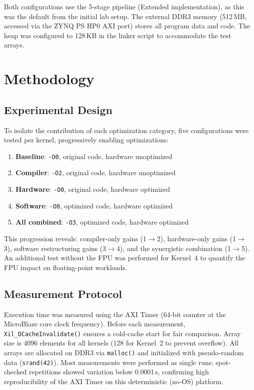 \documentclass[11pt,a4paper]{article}
\begin{document}
Both configurations use the 5-stage pipeline (Extended implementation), as this was the default from the initial lab setup. The external DDR3 memory (512\,MB, accessed via the ZYNQ PS HP0 AXI port) stores all program data and code. The heap was configured to 128\,KB in the linker script to accommodate the test arrays.

\section{Methodology}

\subsection{Experimental Design}

To isolate the contribution of each optimization category, five configurations were tested per kernel, progressively enabling optimizations:

\begin{enumerate}[noitemsep]
    \item \textbf{Baseline}: \texttt{-O0}, original code, hardware unoptimized
    \item \textbf{Compiler}: \texttt{-O2}, original code, hardware unoptimized
    \item \textbf{Hardware}: \texttt{-O0}, original code, hardware optimized
    \item \textbf{Software}: \texttt{-O0}, optimized code, hardware optimized
    \item \textbf{All combined}: \texttt{-O3}, optimized code, hardware optimized
\end{enumerate}

This progression reveals: compiler-only gains (1$\to$2), hardware-only gains (1$\to$3), software restructuring gains (3$\to$4), and the synergistic combination (1$\to$5). An additional test without the FPU was performed for Kernel~4 to quantify the FPU impact on floating-point workloads.

\subsection{Measurement Protocol}

Execution time was measured using the AXI Timer (64-bit counter at the MicroBlaze core clock frequency). Before each measurement, \texttt{Xil\_DCacheInvalidate()} ensures a cold-cache start for fair comparison. Array size is 4096 elements for all kernels (128 for Kernel~2 to prevent overflow). All arrays are allocated on DDR3 via \texttt{malloc()} and initialized with pseudo-random data (\texttt{srand(42)}). Most measurements were performed as single runs; spot-checked repetitions showed variation below 0.0001\,s, confirming high reproducibility of the AXI Timer on this deterministic (no-OS) platform.
\end{document}
